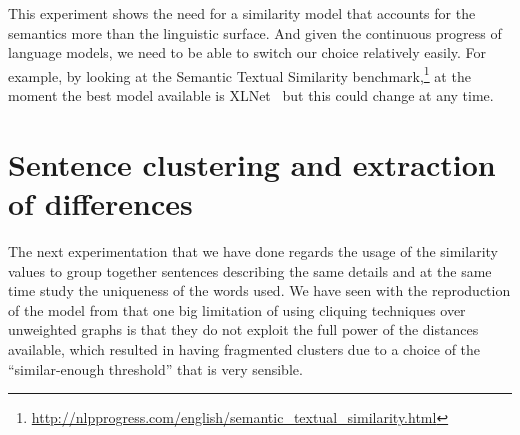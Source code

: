 
This experiment shows the need for a similarity model that accounts for the semantics more than the linguistic surface. And given the continuous progress of language models, we need to be able to switch our choice relatively easily.
For example, by looking at the Semantic Textual Similarity benchmark,\footnote{\url{http://nlpprogress.com/english/semantic_textual_similarity.html}} at the moment the best model available is XLNet~\cite{yang2019xlnet} but this could change at any time.



\section{Sentence clustering and extraction of differences}
\label{sec:cgs_clustering_and_differences}
The next experimentation that we have done regards the usage of the similarity values to group together sentences describing the same details and at the same time study the uniqueness of the words used.
We have seen with the reproduction of the model from \citet{bountouridis2018explaining} that one big limitation of using cliquing techniques over unweighted graphs is that they do not exploit the full power of the distances available, which resulted in having fragmented clusters due to a choice of the ``similar-enough threshold'' that is very sensible.

